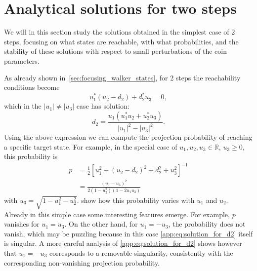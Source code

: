 \section{Analytical solutions for two steps}
\label{app:analytical_sol_2steps}
We will in this section study the solutions obtained in the simplest case of 2 steps, focusing on what states are reachable, with what probabilities, and the stability of these solutions with respect to small perturbations of the coin parameters.

As already shown in~\cref{sec:focusing_walker_states}, for 2 steps the reachability conditions become
\begin{equation}
	u_1^* (u_2 - d_2) + d_2^* u_3 = 0,
	\label{eq:reachability_condition_2steps}
\end{equation}
which in the $\lvert u_1 \rvert \neq \lvert u_3 \rvert$ case has solution:
\begin{equation}
	d_2 = \frac{
		u_1(u_1^* u_2 + u_2^* u_3)
	}{
		\lvert u_1 \rvert^2 - \lvert u_3 \rvert^2
	}.
	\label{app:eq:solution_for_d2}
\end{equation}
Using the above expression we can compute the projection probability of reaching a specific target state.
For example, in the special case of $u_1, u_2, u_3 \in \mathbb R$, $u_3 \ge 0$, this probability is
\begin{equation}
\begin{aligned}
	p &= \frac{1}{2} \left[ u_1^2 + (u_2 - d_2)^2 + d_2^2 + u_3^2 \right]^{-1} \\
	&= \frac{
		\left( u_1 - u_3 \right)^2
	}{
		2(1 - u_2^2)(1 - 2 u_1 u_3)
	}
\end{aligned}
\label{eq:proj_prob_2steps}
\end{equation}
with $u_3 = \sqrt{1 - u_1^2 - u_2^2}$.
 show how this probability varies with $u_1$ and $u_2$.
Already in this simple case some interesting features emerge. For example, $p$ vanishes for $u_1 = u_3$.
On the other hand, for $u_1 = -u_3$, the probability does not vanish, which may be puzzling because in this case \cref{app:eq:solution_for_d2} itself is singular.
A more careful analysis of \cref{app:eq:solution_for_d2} shows however that $u_1 = -u_3$ corresponds to a removable singularity, consistently with the corresponding non-vanishing projection probability.

